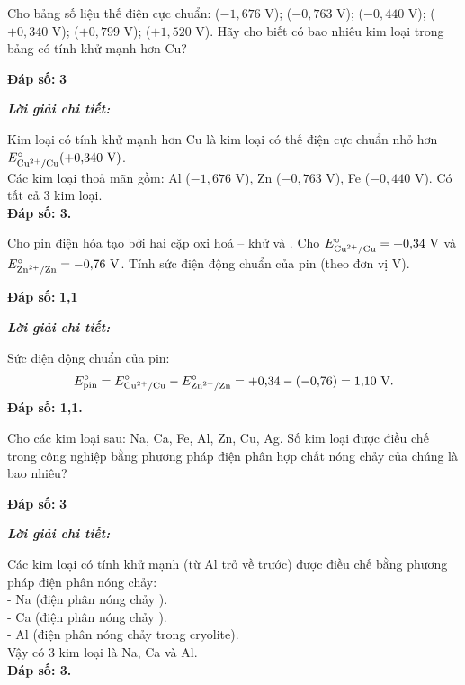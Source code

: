 \documentclass[11pt,a4paper]{article}
\def\loigiai#1{
\par\begingroup\color{blue!80!black}\small
\noindent\textbf{\textit{Lời giải chi tiết:}}\par
#1\par\endgroup}
\begin{document}
\begin{ex}
Cho bảng số liệu thế điện cực chuẩn:  ($-1{,}676\text{ V}$);  ($-0{,}763\text{ V}$);  ($-0{,}440\text{ V}$);  ($+0{,}340\text{ V}$);  ($+0{,}799\text{ V}$);  ($+1{,}520\text{ V}$). Hãy cho biết có bao nhiêu kim loại trong bảng có tính khử mạnh hơn Cu?
\par\noindent\textbf{Đáp số:} \textbf{\color{red}3}
\loigiai{
Kim loại có tính khử mạnh hơn Cu là kim loại có thế điện cực chuẩn nhỏ hơn $E^\circ_{\ce{Cu^2+/Cu}} (+0{,}340\text{ V})$.\\
Các kim loại thoả mãn gồm: Al ($-1{,}676\text{ V}$), Zn ($-0{,}763\text{ V}$), Fe ($-0{,}440\text{ V}$). Có tất cả 3 kim loại.\\
\textbf{Đáp số: 3.}}
\end{ex}

\begin{ex}
Cho pin điện hóa tạo bởi hai cặp oxi hoá -- khử  và . Cho $E^\circ_{\ce{Cu^2+/Cu}} = +0{,}34\text{ V}$ và $E^\circ_{\ce{Zn^2+/Zn}} = -0{,}76\text{ V}$. Tính sức điện động chuẩn của pin (theo đơn vị V).
\par\noindent\textbf{Đáp số:} \textbf{\color{red}1,1}
\loigiai{
Sức điện động chuẩn của pin:
$$E^\circ_{\text{pin}} = E^\circ_{\ce{Cu^2+/Cu}} - E^\circ_{\ce{Zn^2+/Zn}} = +0{,}34 - (-0{,}76) = 1{,}10\text{ V.}$$
\textbf{Đáp số: 1,1.}}
\end{ex}

\begin{ex}
Cho các kim loại sau: Na, Ca, Fe, Al, Zn, Cu, Ag. Số kim loại được điều chế trong công nghiệp bằng phương pháp điện phân hợp chất nóng chảy của chúng là bao nhiêu?
\par\noindent\textbf{Đáp số:} \textbf{\color{red}3}
\loigiai{
Các kim loại có tính khử mạnh (từ Al trở về trước) được điều chế bằng phương pháp điện phân nóng chảy:\\
- Na (điện phân nóng chảy \ce{NaCl}).\\
- Ca (điện phân nóng chảy \ce{CaCl2}).\\
- Al (điện phân nóng chảy \ce{Al2O3} trong cryolite).\\
Vậy có 3 kim loại là Na, Ca và Al.\\
\textbf{Đáp số: 3.}}
\end{ex}
\end{document}
